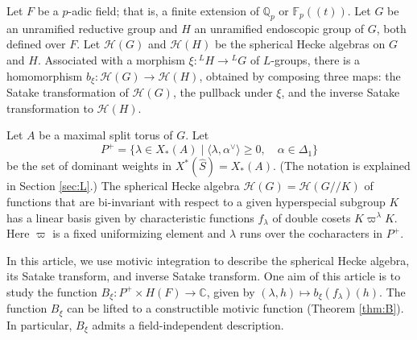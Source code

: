 
% 
% 


\newcommand{\XX}[1]{{\it  [To do: #1]}}
\newcommand{\ring}[1]{\mathbb{#1}}
\newcommand{\ang}[1]{\langle{#1}\rangle}
\def\op#1{{\operatorname{#1}}}
\def\inv{\op{inv}}
\def\dom{P^+}
\def\Q{{\ring{Q}}}
\def\card{\op{card}}
\def\CSrho{[W_S\backslash C_\rho]}

\def\C{\mathcal C}
\def\N{\mathcal N}
\def\H{\mathcal H}
\def\M{\mathcal M}
\def\T{\mathcal T}

\def\n{{\mathfrak n}}
\def\g{{\mathfrak g}}
\def\t{{\mathfrak t}}
\def\h{{\mathfrak h}}

\def\Frob{\op{Frob}}
\def\dotw{\dot w}
\def\uu{\upsilon} %

\def\libel#1{{\text{\sc [#1]~}}\label{#1}}
\def\rif#1{(\ref{#1}-{\text{\sc #1})}}




Let $F$ be a $p$-adic field; that is, a finite extension of
$\ring{Q}_p$ or $\ring{F}_p((t))$.  Let $G$ be an unramified reductive
group and $H$ an unramified endoscopic group of $G$, both defined over
$F$.  Let $\H(G)$ and $\H(H)$ be the spherical Hecke algebras on $G$
and $H$.  Associated with a morphism $\xi:{}^LH\to {}^LG$ of
$L$-groups, there is a homomorphism $b_\xi:\H(G)\to \H(H)$, obtained
by composing three maps: the Satake transformation of $\H(G)$, the
pullback under $\xi$, and the inverse Satake transformation to
$\H(H)$.

Let $A$ be a maximal split torus of $G$.  Let 
\[
\dom = \{\lambda\in X_*(A) \mid \ang{\lambda,\alpha^\vee}\ge 0,
\quad \alpha\in \Delta_1\}
\]
be the set of dominant weights in $X^*(\hat S) = X_*(A)$.  (The notation
is explained in Section \ref{sec:L}.)   The spherical
Hecke algebra $\H(G)=\H(G//K)$ of functions that are bi-invariant with
respect to a given hyperspecial subgroup $K$ has a linear basis given
by characteristic functions $f_\lambda$ of double cosets
$K\varpi^\lambda K$.  Here $\varpi$ is a fixed uniformizing element
and $\lambda$ runs over the cocharacters in
$P^+$.

In this article, we use motivic integration to describe the spherical
Hecke algebra, its Satake transform, and inverse Satake transform.
One aim of this article is to study the function $B_\xi:P^+\times
H(F)\to \ring{C}$, given by $(\lambda,h)\mapsto b_\xi(f_\lambda)(h)$.
The function $B_\xi$ can be lifted to a constructible motivic function
(Theorem \ref{thm:B}).  In particular, $B_\xi$ admits a
field-independent description.

